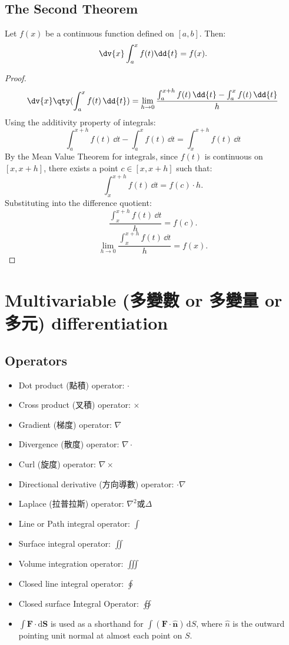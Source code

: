 \documentclass[a4paper,12pt]{report}
\begin{document}
\subsection{The Second Theorem}
Let $f(x)$ be a continuous function defined on $[a,b]$. Then:
\[\dv{x}\int_a^xf(t)\dd{t}=f(x).\]
\begin{proof}
\[\dv{x}\qty(\int_a^xf(t)\,\dd{t})=\lim_{h\to 0}\frac{\int_a^{x+h}f(t)\,\dd{t}-\int_a^xf(t)\,\dd{t}}{h}\]
Using the additivity property of integrals:
\[\int_a^{x+h}f(t)\,\dd{t}-\int_a^xf(t)\,\dd{t}=\int_x^{x+h}f(t)\,\dd{t}\]
By the Mean Value Theorem for integrals, since \(f(t)\) is continuous on \([x,x+h]\), there exists a point \(c\in [x,x+h]\) such that:
\[\int_x^{x+h} f(t)\, \dd{t} = f(c) \cdot h.\]
Substituting into the difference quotient:
\[\frac{\int_x^{x+h}f(t)\,\dd{t}}{h} = f(c).\]
\[\lim_{h\to 0}\frac{\int_x^{x+h}f(t)\,\dd{t}}{h} = f(x).\]
\end{proof}



\section{Multivariable (多變數 or 多變量 or 多元) differentiation}
\subsection{Operators}
\begin{itemize}
\item Dot product (點積) operator: $\cdot$
\item Cross product (叉積) operator: $\times$
\item Gradient (梯度) operator: $\nabla$
\item Divergence (散度) operator: $\nabla \cdot$
\item Curl (旋度) operator: $\nabla \times$
\item Directional derivative (方向導數) operator: $\cdot\nabla$
\item Laplace (拉普拉斯) operator: $\nabla^2$或$\Delta$
\item Line or Path integral operator: $\int$
\item Surface integral operator: $\iint$
\item Volume integration operator: $\iiint$
\item Closed line integral operator: $\oint$
\item Closed surface Integral Operator: $\oiint$
\item $\int\mathbf{F}\cdot\mathrm{d}\mathbf{S}$ is used as a shorthand for $\int(\mathbf{F}\cdot\mathbf{\hat{n}})\,\mathrm{d}S$, where $\hat{n}$ is the outward pointing unit normal at almost each point on $S$.
\end{itemize}
\end{document}
